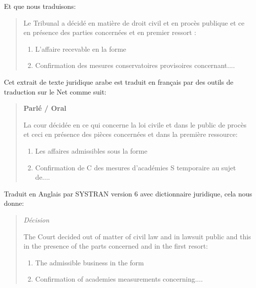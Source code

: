 \documentclass[french]{textolivre}
\begin{document}
Et que nous traduisons:

\begin{quote}
Le Tribunal a décidé en matière de droit civil et en procès publique et ce en présence des parties concernées et en premier ressort :

\begin{enumerate}
    \item L’affaire recevable en la forme
    \item Confirmation des mesures conservatoires provisoires concernant....
\end{enumerate}
\end{quote}

Cet extrait de texte juridique arabe est traduit en français par des outils de traduction sur le Net comme suit:

\begin{quote}
\textbf{Parlé / Oral}

La cour décidée en ce qui concerne la loi civile et dans le public de procès et ceci en présence des pièces concernées et dans la première ressource:

\begin{enumerate}
    \item Les affaires admissibles sous la forme
    \item Confirmation de C des mesures d'académies S temporaire au sujet de....
\end{enumerate}
\end{quote}

Traduit en Anglais par SYSTRAN version 6 avec dictionnaire juridique, cela nous donne:

\begin{quote}
\emph{Décision}

The Court decided out of matter of civil law and in lawsuit public and this in the presence of the parts concerned and in the first resort:

\begin{enumerate}
    \item The admissible business in the form
    \item Confirmation of academies measurements concerning....
\end{enumerate}
\end{quote}
\end{document}
